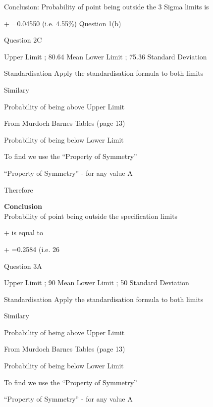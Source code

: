 \documentclass[]{report}
\begin{document}
Conclusion: 
Probability of point being outside the 3 Sigma limits is

+ =0.04550 	(i.e. 4.55\%) Question 1(b)
















Question 2C

Upper Limit ; 80.64		Mean		 	
Lower Limit ; 75.36		Standard Deviation	 

Standardisation
Apply the standardisation formula	 	to both limits


Similary



Probability of being above Upper Limit

From Murdoch Barnes Tables (page 13)  

Probability of being below Lower Limit


To find   we use the “Property of Symmetry”

“Property of Symmetry” -   for any value A

Therefore 

\noindent \textbf{Conclusion}\\
Probability of point being outside the specification limits 

+ is equal to

+ =0.2584 	(i.e. 26%


\bigskip		










Question 3A

Upper Limit ; 90		Mean		 	
Lower Limit ; 50		Standard Deviation	 

Standardisation
Apply the standardisation formula	 	to both limits


Similary



Probability of being above Upper Limit

From Murdoch Barnes Tables (page 13)  

Probability of being below Lower Limit


To find   we use the “Property of Symmetry”

“Property of Symmetry” -   for any value A
\end{document}
